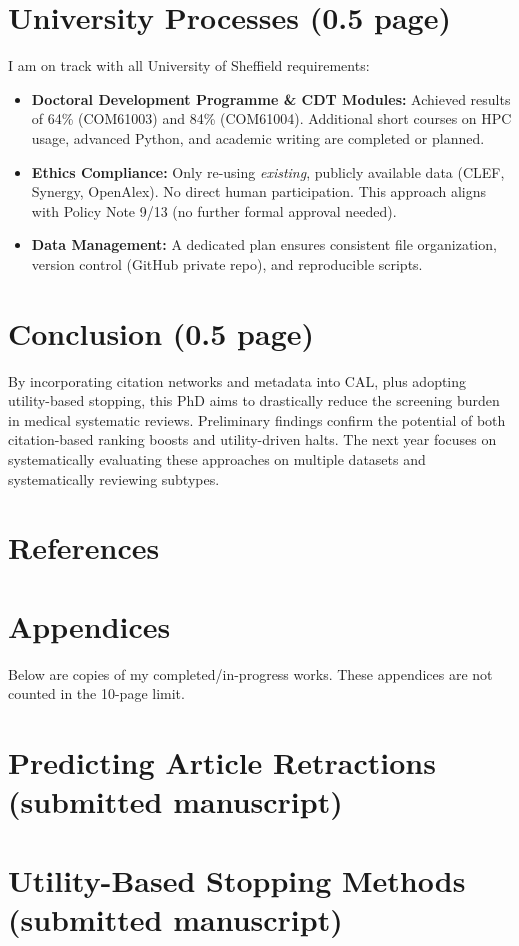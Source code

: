 \documentclass[11pt,a4paper]{article}
\begin{document}
\section{University Processes (0.5 page)}
I am on track with all University of Sheffield requirements:
\begin{itemize}[leftmargin=1.5em]
    \item \textbf{Doctoral Development Programme \& CDT Modules:} Achieved results of 64\% (COM61003) and 84\% (COM61004). Additional short courses on HPC usage, advanced Python, and academic writing are completed or planned.
    \item \textbf{Ethics Compliance:} Only re-using \emph{existing}, publicly available data (CLEF, Synergy, OpenAlex). No direct human participation. This approach aligns with Policy Note 9/13 (no further formal approval needed).
    \item \textbf{Data Management:} A dedicated plan ensures consistent file organization, version control (GitHub private repo), and reproducible scripts.
\end{itemize}

\section{Conclusion (0.5 page)}
By incorporating citation networks and metadata into CAL, plus adopting utility-based stopping, this PhD aims to drastically reduce the screening burden in medical systematic reviews. Preliminary findings confirm the potential of both citation-based ranking boosts and utility-driven halts. The next year focuses on systematically evaluating these approaches on multiple datasets and systematically reviewing subtypes. 

\section*{References}
\printbibliography[heading=none]

\newpage
\appendix
\section*{Appendices}
\vspace{-1em}
Below are copies of my completed/in-progress works. These appendices are not counted in the 10-page limit.

\section{Predicting Article Retractions (submitted manuscript)}


\section{Utility-Based Stopping Methods (submitted manuscript)}


\end{document}

